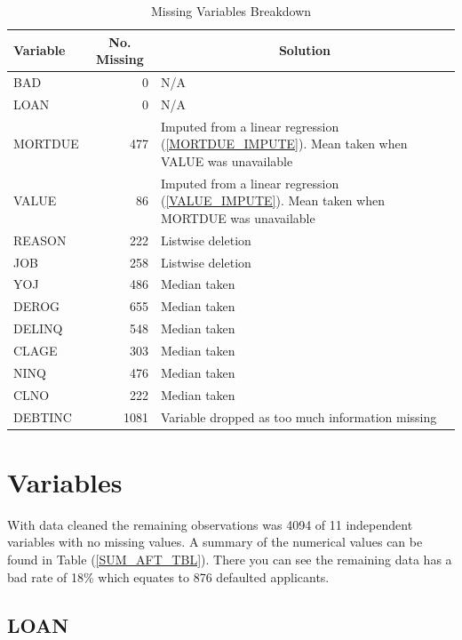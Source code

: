 \begin{table}[ht]
	\centering
	\renewcommand{\arraystretch}{1.25}
	\begin{tabular}{l r p{9cm}}
	\hline
	Variable & \multicolumn{1}{c}{No. Missing} & \multicolumn{1}{c}{Solution}\\ 
	\hline
	BAD & 0 & N/A\\
	LOAN & 0 & N/A \\
	MORTDUE & 477 & Imputed from a linear regression (\ref{MORTDUE_IMPUTE}). Mean taken when VALUE was unavailable \\
	VALUE & 86 & Imputed from a linear regression (\ref{VALUE_IMPUTE}). Mean taken when MORTDUE was unavailable \\
	REASON & 222 & Listwise deletion \\
	JOB & 258 & Listwise deletion \\
	YOJ & 486 & Median taken\\
	DEROG & 655 & Median taken \\
	DELINQ & 548 & Median taken\\
	CLAGE & 303 & Median taken \\
	NINQ & 476 & Median taken\\
	CLNO & 222 & Median taken \\
	DEBTINC & 1081 & Variable dropped as too much information missing\\
	\end{tabular}
	\caption{Missing Variables Breakdown \label{DataCleanSummary}}
\end{table}

\section{Variables}\label{sec:variables}

With data cleaned the remaining observations was 4094 of 11 independent variables with no missing values. A summary of the numerical values can be found in Table (\ref{SUM_AFT_TBL}). There you can see the remaining data has a bad rate of 18\% which equates to 876 defaulted applicants.

\subsection*{LOAN}

